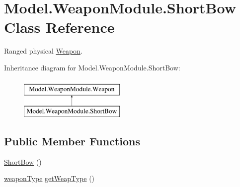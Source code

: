\hypertarget{class_model_1_1_weapon_module_1_1_short_bow}{}\section{Model.\+Weapon\+Module.\+Short\+Bow Class Reference}
\label{class_model_1_1_weapon_module_1_1_short_bow}


Ranged physical \hyperlink{interface_model_1_1_weapon_module_1_1_weapon}{Weapon}.  


Inheritance diagram for Model.\+Weapon\+Module.\+Short\+Bow\+:\begin{figure}[H]
\begin{center}
\leavevmode
\includegraphics[height=2.000000cm]{class_model_1_1_weapon_module_1_1_short_bow}
\end{center}
\end{figure}
\subsection*{Public Member Functions}
\begin{DoxyCompactItemize}
\item 
\hyperlink{class_model_1_1_weapon_module_1_1_short_bow_a2b49cb683d778bb89ceed9bd2cec92c6}{Short\+Bow} ()
\item 
\hyperlink{namespace_model_1_1_weapon_module_a3390c266f89e3399c2bc7fa31f13cbec}{weapon\+Type} \hyperlink{class_model_1_1_weapon_module_1_1_short_bow_a50b5acd4e433303752e04397aeea86df}{get\+Weap\+Type} ()
\end{DoxyCompactItemize}
